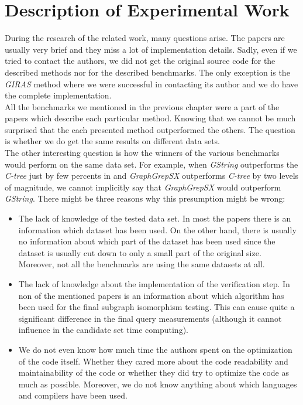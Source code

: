 \chapter{Description of Experimental Work}
During the research of the related work, many questions arise. The papers are usually very brief and they miss a lot of implementation details. Sadly, even if we tried to contact the authors, we did not get the original source code for the described methods nor for the described benchmarks. The only exception is the \textit{GIRAS} method where we were successful in contacting its author and we do have the complete implementation.\\

All the benchmarks we mentioned in the previous chapter were a part of the papers which describe each particular method. Knowing that we cannot be much surprised that the each presented method outperformed the others. The question is whether we do get the same results on different data sets.\\

The other interesting question is how the winners of the various benchmarks would perform on the same data set. For example, when \textit{GString} outperforms the \textit{C-tree} just by few percents in \cite{GString} and \textit{GraphGrepSX} outperforms \textit{C-tree} by two levels of magnitude, we cannot implicitly say that \textit{GraphGrepSX} would outperform \textit{GString}. There might be three reasons why this presumption might be wrong:

\begin{itemize}
	\item The lack of knowledge of the tested data set. In most the papers there is an information which dataset has been used. On the other hand, there is usually no information about which part of the dataset has been used since the dataset is usually cut down to only a small part of the original size. Moreover, not all the benchmarks are using the same datasets at all.
	\item The lack of knowledge about the implementation of the verification step. In non of the mentioned papers is an information about which algorithm has been used for the final subgraph isomorphism testing. This can cause quite a significant difference in the final query measurements (although it cannot influence in the candidate set time computing).
	\item We do not even know how much time the authors spent on the optimization of the code itself. Whether they cared more about the code readability and maintainability of the code or whether they did try to optimize the code as much as possible. Moreover, we do not know anything about which languages and compilers have been used.
\end{itemize}

